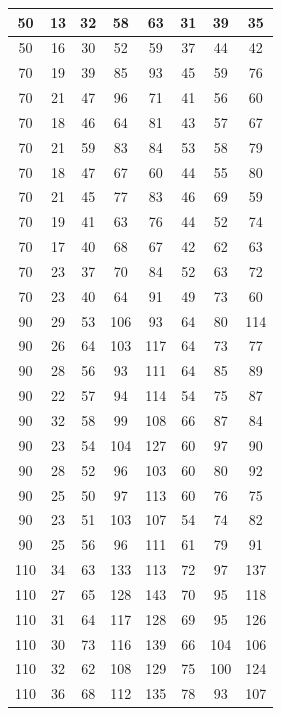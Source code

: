 \begin{longtable}[c]{|c|c|c|c|c|c|c|c|}
50  & 13 & 32 & 58  & 63  & 31  & 39  & 35  \\ \hline
50  & 16 & 30 & 52  & 59  & 37  & 44  & 42  \\ \hline
70  & 19 & 39 & 85  & 93  & 45  & 59  & 76  \\ \hline
70  & 21 & 47 & 96  & 71  & 41  & 56  & 60  \\ \hline
70  & 18 & 46 & 64  & 81  & 43  & 57  & 67  \\ \hline
70  & 21 & 59 & 83  & 84  & 53  & 58  & 79  \\ \hline
70  & 18 & 47 & 67  & 60  & 44  & 55  & 80  \\ \hline
70  & 21 & 45 & 77  & 83  & 46  & 69  & 59  \\ \hline
70  & 19 & 41 & 63  & 76  & 44  & 52  & 74  \\ \hline
70  & 17 & 40 & 68  & 67  & 42  & 62  & 63  \\ \hline
70  & 23 & 37 & 70  & 84  & 52  & 63  & 72  \\ \hline
70  & 23 & 40 & 64  & 91  & 49  & 73  & 60  \\ \hline
90  & 29 & 53 & 106 & 93  & 64  & 80  & 114 \\ \hline
90  & 26 & 64 & 103 & 117 & 64  & 73  & 77  \\ \hline
90  & 28 & 56 & 93  & 111 & 64  & 85  & 89  \\ \hline
90  & 22 & 57 & 94  & 114 & 54  & 75  & 87  \\ \hline
90  & 32 & 58 & 99  & 108 & 66  & 87  & 84  \\ \hline
90  & 23 & 54 & 104 & 127 & 60  & 97  & 90  \\ \hline
90  & 28 & 52 & 96  & 103 & 60  & 80  & 92  \\ \hline
90  & 25 & 50 & 97  & 113 & 60  & 76  & 75  \\ \hline
90  & 23 & 51 & 103 & 107 & 54  & 74  & 82  \\ \hline
90  & 25 & 56 & 96  & 111 & 61  & 79  & 91  \\ \hline
110 & 34 & 63 & 133 & 113 & 72  & 97  & 137 \\ \hline
110 & 27 & 65 & 128 & 143 & 70  & 95  & 118 \\ \hline
110 & 31 & 64 & 117 & 128 & 69  & 95  & 126 \\ \hline
110 & 30 & 73 & 116 & 139 & 66  & 104 & 106 \\ \hline
110 & 32 & 62 & 108 & 129 & 75  & 100 & 124 \\ \hline
110 & 36 & 68 & 112 & 135 & 78  & 93  & 107 \\ \hline

\end{longtable}
